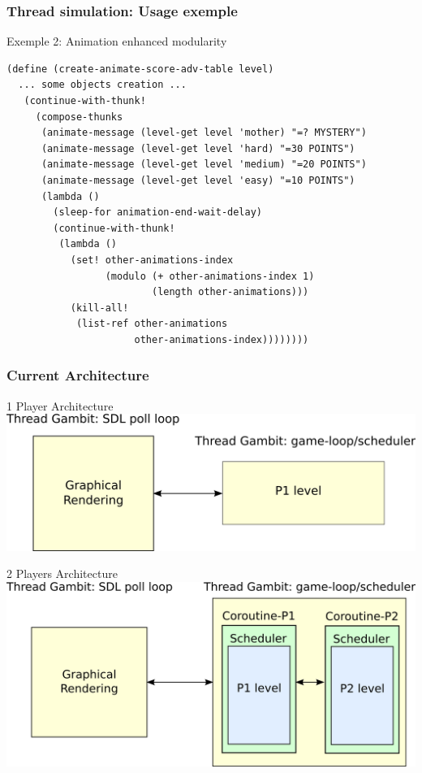 \documentclass{beamer}
\newcommand{\<}[1]{\`#1}
\begin{document}
\begin{frame}[fragile]
  \frametitle{Thread simulation: Usage exemple}
  \begin{block}{Exemple 2: Animation enhanced modularity}
    \begin{lstlisting}[basicstyle=\footnotesize]
(define (create-animate-score-adv-table level)
  ... some objects creation ...
   (continue-with-thunk!
     (compose-thunks
      (animate-message (level-get level 'mother) "=? MYSTERY")
      (animate-message (level-get level 'hard) "=30 POINTS")
      (animate-message (level-get level 'medium) "=20 POINTS")
      (animate-message (level-get level 'easy) "=10 POINTS")
      (lambda ()
        (sleep-for animation-end-wait-delay)
        (continue-with-thunk!
         (lambda ()
           (set! other-animations-index
                 (modulo (+ other-animations-index 1)
                         (length other-animations)))
           (kill-all!
            (list-ref other-animations
                      other-animations-index))))))))
    \end{lstlisting}
    \end{block}
\end{frame}

\begin{frame}
  \frametitle{Current Architecture}
  \begin{block}{1 Player Architecture}
    \includegraphics[scale=0.5]{arch-recent-1p}
  \end{block}

  \begin{block}{2 Players Architecture}
    \includegraphics[scale=0.5]{arch-recent-2p}
  \end{block}
\end{frame}
\end{document}
